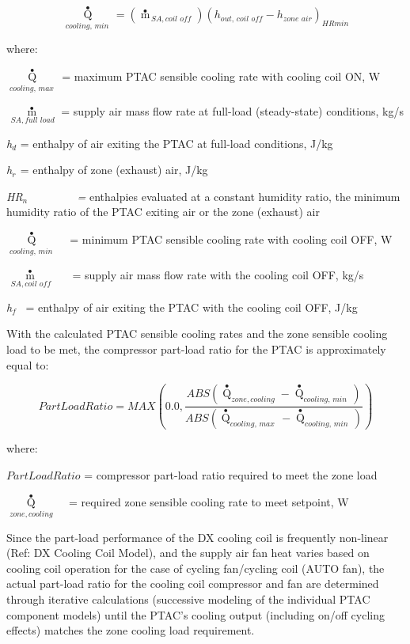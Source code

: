 \begin{equation}
{\mathop Q\limits^ \bullet_{cooling,\,min\,}} = \left( {{{\mathop m\limits^ \bullet  }_{\,SA,coil\,\,off}}} \right){\left( {{h_{out,\,coil\,\,off}} - {h_{zone\,\,air}}} \right)_{HRmin}}
\end{equation}

where:

\({\mathop Q\limits^ \bullet_{cooling,\,max\,}}\) = maximum PTAC sensible cooling rate with cooling coil ON, W

\({\mathop m\limits^ \bullet_{\,SA,full\,\,load}}\) = supply air mass flow rate at full-load (steady-state) conditions, kg/s

\emph{h\(_{d}\)} = enthalpy of air exiting the PTAC at full-load conditions, J/kg

\emph{h\(_{r}\)}\(_{ }\) = enthalpy of zone (exhaust) air, J/kg

\emph{HR\(_{n}\)~~~~~~~~ =} enthalpies evaluated at a constant humidity ratio, the minimum humidity ratio of the PTAC exiting air or the zone (exhaust) air

\({\mathop Q\limits^ \bullet_{cooling,\,min\,}}\) ~ = minimum PTAC sensible cooling rate with cooling coil OFF, W

\({\mathop m\limits^ \bullet_{\,SA,coil\,\,off}}\) ~~ = supply air mass flow rate with the cooling coil OFF, kg/s

\emph{h\(_{f}\)}~ = enthalpy of air exiting the PTAC with the cooling coil OFF, J/kg

With the calculated PTAC sensible cooling rates and the zone sensible cooling load to be met, the compressor part-load ratio for the PTAC is approximately equal to:

\begin{equation}
PartLoadRatio = MAX\left( {0.0,\frac{{ABS\left( {{{\mathop Q\limits^ \bullet  }_{zone,cooling}} - {{\mathop Q\limits^ \bullet  }_{cooling,\,min\,}}} \right)}}{{ABS\left( {{{\mathop Q\limits^ \bullet  }_{cooling,\,max\,}} - {{\mathop Q\limits^ \bullet  }_{cooling,\,min\,}}} \right)}}} \right)
\end{equation}

where:

\(PartLoadRatio\) = compressor part-load ratio required to meet the zone load

\({\mathop Q\limits^ \bullet_{zone,cooling}}\) ~ = required zone sensible cooling rate to meet setpoint, W

Since the part-load performance of the DX cooling coil is frequently non-linear (Ref: DX Cooling Coil Model), and the supply air fan heat varies based on cooling coil operation for the case of cycling fan/cycling coil (AUTO fan), the actual part-load ratio for the cooling coil compressor and fan are determined through iterative calculations (successive modeling of the individual PTAC component models) until the PTAC's cooling output (including on/off cycling effects) matches the zone cooling load requirement.

